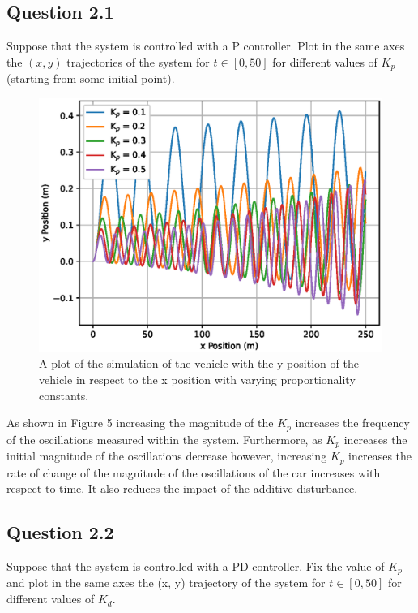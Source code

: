 \documentclass[a4paper,10pt,reqno]{amsart}
\numberwithin{equation}{section}
\begin{document}
    \subsection{Question 2.1}
        Suppose that the system is controlled with a P controller. Plot in the same axes the \((x, y)\) trajectories of the system for \(t \in [0, 50]\) for different values of \(K_p\) (starting from some initial point).
        
        \begin{figure}[h]
            \centering
            \includegraphics[width=0.6\linewidth]{figures/question_2_1.eps}
            \caption{A plot of the simulation of the vehicle with the y position of the vehicle in respect to the x position with varying proportionality constants.}
        \end{figure}
        
        \medskip
        As shown in Figure 5 increasing the magnitude of the \(K_p\) increases the frequency of the oscillations measured within the system. Furthermore, as \(K_p\) increases the initial magnitude of the oscillations decrease however, increasing \(K_p\) increases the rate of change of the magnitude of the oscillations of the car increases with respect to time. It also reduces the impact of the additive disturbance.
        
    \subsection{Question 2.2}
         Suppose that the system is controlled with a PD controller. Fix the value of \(K_p\) and plot in the same axes the (x, y) trajectory of the system for \(t \in [0, 50]\) for different values of \(K_d\).
         
\end{document}
